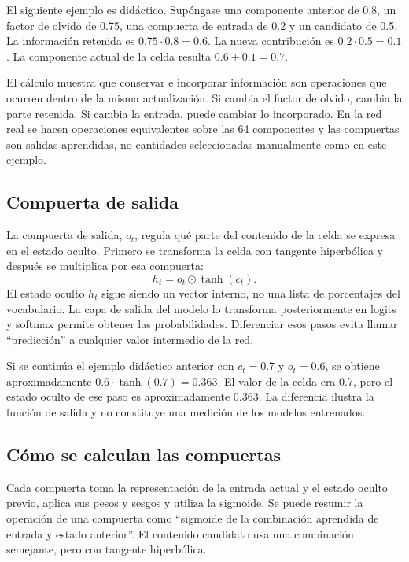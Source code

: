 El siguiente ejemplo es didáctico. Supóngase una componente anterior de 0.8, un factor de olvido de 0.75, una compuerta de entrada de 0.2 y un candidato de 0.5. La información retenida es $0.75\cdot0.8=0.6$. La nueva contribución es $0.2\cdot0.5=0.1$. La componente actual de la celda resulta $0.6+0.1=0.7$.

El cálculo muestra que conservar e incorporar información son operaciones que ocurren dentro de la misma actualización. Si cambia el factor de olvido, cambia la parte retenida. Si cambia la entrada, puede cambiar lo incorporado. En la red real se hacen operaciones equivalentes sobre las 64 componentes y las compuertas son salidas aprendidas, no cantidades seleccionadas manualmente como en este ejemplo.

\subsection{Compuerta de salida}
La compuerta de salida, $o_t$, regula qué parte del contenido de la celda se expresa en el estado oculto. Primero se transforma la celda con tangente hiperbólica y después se multiplica por esa compuerta:
\begin{equation}\label{eq:salida_lstm}
h_t=o_t\odot\tanh(c_t).
\end{equation}
El estado oculto $h_t$ sigue siendo un vector interno, no una lista de porcentajes del vocabulario. La capa de salida del modelo lo transforma posteriormente en logits y softmax permite obtener las probabilidades. Diferenciar esos pasos evita llamar ``predicción'' a cualquier valor intermedio de la red.

Si se continúa el ejemplo didáctico anterior con $c_t=0.7$ y $o_t=0.6$, se obtiene aproximadamente $0.6\cdot\tanh(0.7)=0.363$. El valor de la celda era 0.7, pero el estado oculto de ese paso es aproximadamente 0.363. La diferencia ilustra la función de salida y no constituye una medición de los modelos entrenados.

\subsection{Cómo se calculan las compuertas}
Cada compuerta toma la representación de la entrada actual y el estado oculto previo, aplica sus pesos y sesgos y utiliza la sigmoide. Se puede resumir la operación de una compuerta como ``sigmoide de la combinación aprendida de entrada y estado anterior''. El contenido candidato usa una combinación semejante, pero con tangente hiperbólica.

